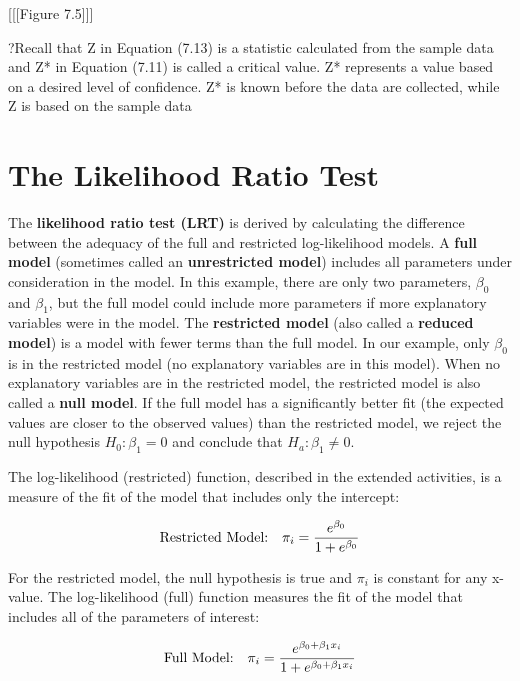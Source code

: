 \documentclass[
]{report}
\begin{document}
{[}{[}{[}Figure 7.5{]}{]}{]}

?Recall that Z in Equation (7.13) is a statistic calculated from the sample data and Z* in Equation (7.11) is called a critical
value. Z* represents a value based on a desired level of confidence. Z* is known before the data are collected, while Z is
based on the sample data

\section{\texorpdfstring{\textbf{The Likelihood Ratio Test}}{The Likelihood Ratio Test}}\label{the-likelihood-ratio-test}

The \textbf{likelihood ratio test (LRT)} is derived by calculating the difference between the adequacy of the full and restricted log-likelihood models. A \textbf{full model} (sometimes called an \textbf{unrestricted model}) includes all parameters under consideration in the model. In this example, there are only two parameters, \(\beta_0\) and \(\beta_1\), but the full model could include more parameters if more explanatory variables were in the model. The \textbf{restricted model} (also called a \textbf{reduced model}) is a model with fewer terms than the full model. In our example, only \(\beta_0\) is in the restricted model (no explanatory variables are in this model). When no explanatory variables are in the restricted model, the restricted model is also called a \textbf{null model}. If the full model has a significantly better fit (the expected values are closer to the observed values) than the restricted model, we reject the null hypothesis \(H_0: \beta_1 = 0\) and conclude that \(H_a: \beta_1 \neq 0\).

The log-likelihood (restricted) function, described in the extended activities, is a measure of the fit of the model that includes only the intercept:

\begin{align}
\text{Restricted Model:} \quad \pi_i = \frac{e^{\beta_0}}{1 + e^{\beta_0}}
\notag
\end{align}

For the restricted model, the null hypothesis is true and \(\pi_i\) is constant for any x-value. The log-likelihood (full) function measures the fit of the model that includes all of the parameters of interest:

\begin{align}
\text{Full Model:} \quad \pi_i = \frac{e^{\beta_0 + \beta_1 x_i}}{1 + e^{\beta_0 + \beta_1 x_i}}
\notag
\end{align}
\end{document}
